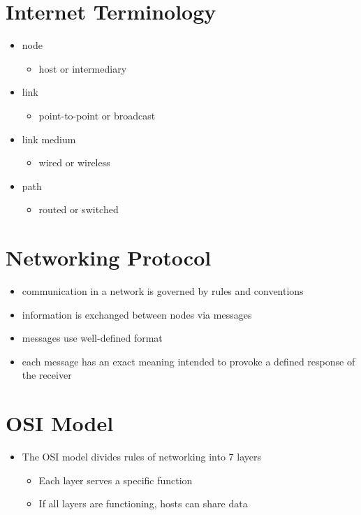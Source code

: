 \documentclass{report}
\begin{document}
\section{Internet Terminology}
\begin{itemize}
  \item node
    \begin{itemize}[label=$\circ$]
      \item host or intermediary
    \end{itemize}
  \item link
    \begin{itemize}[label=$\circ$]
      \item point-to-point or broadcast
    \end{itemize}
  \item link medium
    \begin{itemize}[label=$\circ$]
      \item wired or wireless
    \end{itemize}
  \item path
    \begin{itemize}[label=$\circ$]
      \item routed or switched
    \end{itemize}
\end{itemize}
\section{Networking Protocol}
\begin{itemize}
  \item communication in a network is governed by rules and conventions
  \item information is exchanged between nodes via messages
  \item messages use well-defined format
  \item each message has an exact meaning intended to provoke a defined response of the receiver
\end{itemize}
\newpage
\section{OSI Model}
\begin{itemize}
  \item The OSI model divides rules of networking into 7 layers
\begin{itemize}[label=$\circ$]
  \item Each layer serves a specific function
  \item If all layers are functioning, hosts can share data
\end{itemize}
\end{itemize}
\end{document}
